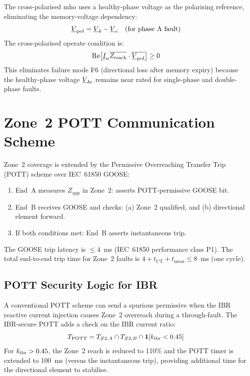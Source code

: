 The cross-polarised mho uses a healthy-phase voltage as the polarising
reference, eliminating the memory-voltage dependency:
\begin{equation}
  \underline{V}_\mathrm{pol} = \underline{V}_b - \underline{V}_c
    \quad\text{(for phase~A fault)}
  \label{eq:ch5_crosspol}
\end{equation}
The cross-polarised operate condition is:
\begin{equation}
  \mathrm{Re}\!\left[\underline{I}_a \overline{Z_\mathrm{reach}}
    \cdot \overline{\underline{V}_\mathrm{pol}}\right] \geq 0
  \label{eq:ch5_crosspol_operate}
\end{equation}
This eliminates failure mode F6 (directional loss after memory expiry)
because the healthy-phase voltage $\underline{V}_{bc}$ remains near rated
for single-phase and double-phase faults.

\section{Zone~2 POTT Communication Scheme}
\label{sec:ch5_pott}

Zone~2 coverage is extended by the Permissive Overreaching Transfer Trip
(POTT) scheme over IEC~61850 GOOSE:
\begin{enumerate}
\item End~A measures $Z_\mathrm{app}$ in Zone~2: asserts POTT-permissive
      GOOSE bit.
\item End~B receives GOOSE and checks: (a) Zone~2 qualified, and
      (b) directional element forward.
\item If both conditions met: End~B asserts instantaneous trip.
\end{enumerate}
The GOOSE trip latency is $\leq 4$~ms (IEC~61850 performance class P1).
The total end-to-end trip time for Zone~2 faults is $4 + t_\mathrm{CT} +
t_\mathrm{meas} \leq 8$~ms (one cycle).

\subsection{POTT Security Logic for IBR}

A conventional POTT scheme can send a spurious permissive when the IBR
reactive current injection causes Zone~2 overreach during a through-fault.
The IBR-secure POTT adds a check on the IBR current ratio:
\begin{equation}
  T_\mathrm{POTT} = T_{Z2,A} \cap T_{Z2,B} \cap
    \mathbf{1}\!\left[k_\mathrm{ibr} < 0.45\right]
  \label{eq:ch5_pott_ibr}
\end{equation}
For $k_\mathrm{ibr} > 0.45$, the Zone~2 reach is reduced to 110\% and the POTT
timer is extended to 100~ms (versus the instantaneous trip), providing
additional time for the directional element to stabilise.

